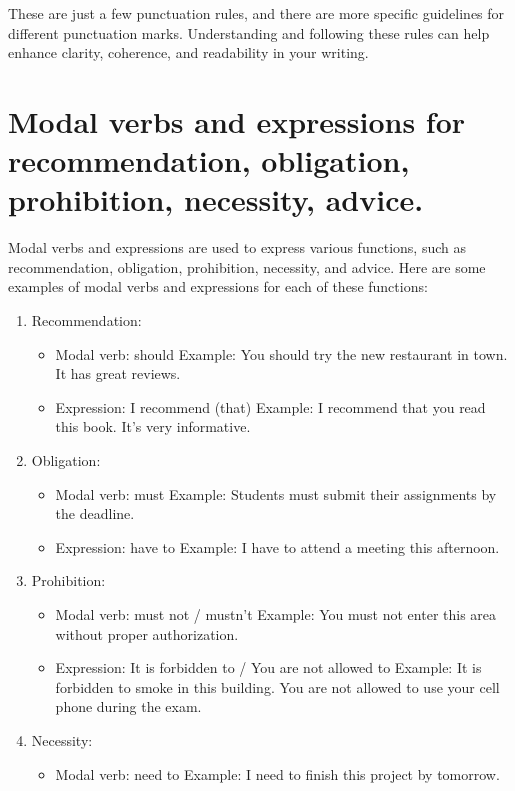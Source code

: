 \documentclass{article}
\begin{document}
These are just a few punctuation rules, and there are more specific guidelines for different punctuation marks. Understanding and following these rules can help enhance clarity, coherence, and readability in your writing.

\section*{Modal verbs and expressions for recommendation, obligation, prohibition, necessity, advice.}
Modal verbs and expressions are used to express various functions, such as recommendation, obligation, prohibition, necessity, and advice. Here are some examples of modal verbs and expressions for each of these functions:

\begin{enumerate}
    \item Recommendation:
    \begin{itemize}
        \item Modal verb: should
        Example: You should try the new restaurant in town. It has great reviews.
        \item Expression: I recommend (that)
        Example: I recommend that you read this book. It's very informative.
    \end{itemize}
    \item Obligation:
    \begin{itemize}
        \item Modal verb: must
        Example: Students must submit their assignments by the deadline.
        \item Expression: have to
        Example: I have to attend a meeting this afternoon.
    \end{itemize}
    \item Prohibition:
    \begin{itemize}
        \item Modal verb: must not / mustn't
        Example: You must not enter this area without proper authorization.
        \item Expression: It is forbidden to / You are not allowed to
        Example: It is forbidden to smoke in this building. You are not allowed to use your cell phone during the exam.
    \end{itemize}
    \item Necessity:
    \begin{itemize}
        \item Modal verb: need to
        Example: I need to finish this project by tomorrow.

\end{itemize}
\end{enumerate}
\end{document}
